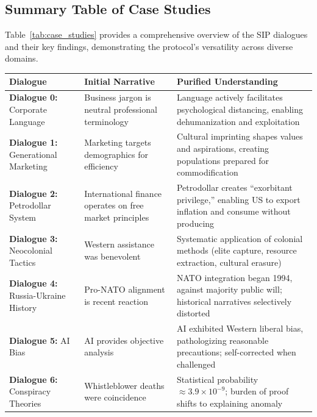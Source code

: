 \documentclass[11pt,a4paper]{article}
\begin{document}
\begin{small}



\clearpage
\appendix



\section{Summary Table of Case Studies}
\label{app:case_summary}

Table~\ref{tab:case_studies} provides a comprehensive overview of the SIP dialogues and their key findings, demonstrating the protocol's versatility across diverse domains.

\begin{table}[ht]
\centering
\small
\begin{tabular}{@{}p{3cm}p{4.5cm}p{6cm}@{}}
\toprule
\textbf{Dialogue} & \textbf{Initial Narrative} & \textbf{Purified Understanding} \\
\midrule
\textbf{Dialogue 0:} Corporate Language & Business jargon is neutral professional terminology & Language actively facilitates psychological distancing, enabling dehumanization and exploitation \\
\addlinespace
\textbf{Dialogue 1:} Generational Marketing & Marketing targets demographics for efficiency & Cultural imprinting shapes values and aspirations, creating populations prepared for commodification \\
\addlinespace
\textbf{Dialogue 2:} Petrodollar System & International finance operates on free market principles & Petrodollar creates ``exorbitant privilege,'' enabling US to export inflation and consume without producing \\
\addlinespace
\textbf{Dialogue 3:} Neocolonial Tactics & Western assistance was benevolent & Systematic application of colonial methods (elite capture, resource extraction, cultural erasure) \\
\addlinespace
\textbf{Dialogue 4:} Russia-Ukraine History & Pro-NATO alignment is recent reaction & NATO integration began 1994, against majority public will; historical narratives selectively distorted \\
\addlinespace
\textbf{Dialogue 5:} AI Bias & AI provides objective analysis & AI exhibited Western liberal bias, pathologizing reasonable precautions; self-corrected when challenged \\
\addlinespace
\textbf{Dialogue 6:} Conspiracy Theories & Whistleblower deaths were coincidence & Statistical probability $\approx 3.9 \times 10^{-9}$; burden of proof shifts to explaining anomaly \\

\end{tabular}
\end{table}
\end{small}
\end{document}
